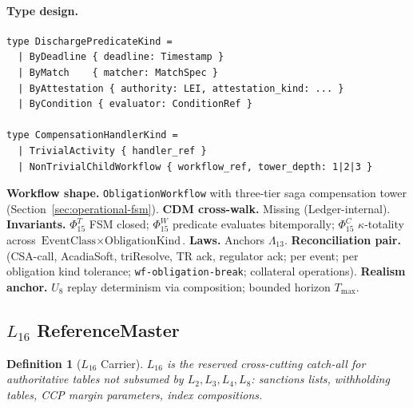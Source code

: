 \documentclass[11pt,a4paper]{article}
\newtheorem{definition}{Definition}[section]
\begin{document}
\paragraph{Type design.}
\begin{lstlisting}
type DischargePredicateKind =
  | ByDeadline { deadline: Timestamp }
  | ByMatch    { matcher: MatchSpec }
  | ByAttestation { authority: LEI, attestation_kind: ... }
  | ByCondition { evaluator: ConditionRef }

type CompensationHandlerKind =
  | TrivialActivity { handler_ref }
  | NonTrivialChildWorkflow { workflow_ref, tower_depth: 1|2|3 }
\end{lstlisting}
\textbf{Workflow shape.} \texttt{ObligationWorkflow} with three-tier saga compensation tower (Section~\ref{sec:operational-fsm}). \textbf{CDM cross-walk.} Missing (Ledger-internal). \textbf{Invariants.} $\Phi_{15}^T$ FSM closed; $\Phi_{15}^W$ predicate evaluates bitemporally; $\Phi_{15}^C$ $\kappa$-totality across $\text{EventClass} \times \text{ObligationKind}$. \textbf{Laws.} Anchors $\Lambda_{13}$. \textbf{Reconciliation pair.} (CSA-call, AcadiaSoft, triResolve, TR ack, regulator ack; per event; per obligation kind tolerance; \texttt{wf-obligation-break}; collateral operations). \textbf{Realism anchor.} $U_8$ replay determinism via composition; bounded horizon $T_{\max}$.

\subsection{$L_{16}$ ReferenceMaster}
\label{sec:leaf-l16}

\begin{definition}[$L_{16}$ Carrier]
$L_{16}$ is the reserved cross-cutting catch-all for authoritative tables not subsumed by $L_2, L_3, L_4, L_8$: sanctions lists, withholding tables, CCP margin parameters, index compositions.
\end{definition}
\end{document}
